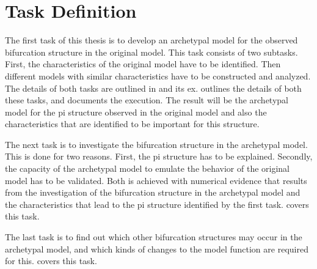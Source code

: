 \chapter{Task Definition}
\label{chap:task}

The first task of this thesis is to develop an archetypal model for the observed bifurcation structure in the original model.
This task consists of two subtasks.
First, the characteristics of the original model have to be identified.
Then different models with similar characteristics have to be constructed and analyzed.
The details of both tasks are outlined in  and its ex.
 outlines the details of both these tasks, and  documents the execution.
The result will be the archetypal model for the \gls{pi} structure observed in the original model and also the characteristics that are identified to be important for this structure.

The next task is to investigate the bifurcation structure in the archetypal model.
This is done for two reasons.
First, the \gls{pi} structure has to be explained.
Secondly, the capacity of the archetypal model to emulate the behavior of the original model has to be validated.
Both is achieved with numerical evidence that results from the investigation of the bifurcation structure in the archetypal model and the characteristics that lead to the \gls{pi} structure identified by the first task.
 covers this task.

The last task is to find out which other bifurcation structures may occur in the archetypal model, and which kinds of changes to the model function are required for this.
 covers this task.
